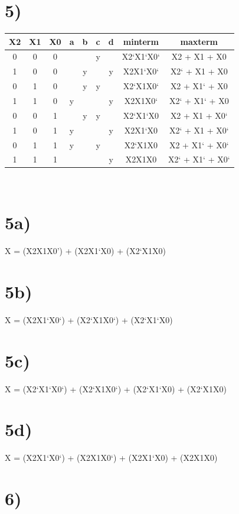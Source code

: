 \documentclass[a4paper,11pt]{article}
\begin{document}
\section*{5)}
\begin{tabular}{| c | c | c | c | c | c | c | c | c | }
  \hline	
       X2 & X1 & X0  & a & b & c & d & minterm & maxterm \\  \hline
       0 & 0 & 0  &  &  & y &   & X2`X1`X0` & X2 + X1 + X0 \\  \hline
       1 & 0 & 0  &  & y &  & y & X2X1`X0` & X2` + X1 + X0  \\  \hline
       0 & 1 & 0  &  & y & y &   & X2`X1X0` & X2 + X1` + X0 \\  \hline
       1 & 1 & 0  & y &  &  &  y & X2X1X0` & X2` + X1` + X0 \\  \hline
       0 & 0 & 1  &  & y & y &   & X2`X1`X0 & X2 + X1 + X0` \\  \hline
       1 & 0 & 1  & y &  &  &  y & X2X1`X0 & X2` + X1 + X0` \\  \hline
       0 & 1 & 1  & y &  & y &   & X2`X1X0 & X2 + X1` + X0` \\  \hline
       1 & 1 & 1  &  &  &  &  y & X2X1X0 & X2` + X1` + X0` \\  \hline
\end{tabular} \\

\section*{5a)}
X = (X2X1X0') + (X2X1`X0) + (X2`X1X0)

\section*{5b)}
X = (X2X1`X0`) + (X2`X1X0`) + (X2`X1`X0)

\section*{5c)}
X = (X2`X1`X0`) + (X2`X1X0`) + (X2`X1`X0) + (X2`X1X0)

\section*{5d)}
X = (X2X1`X0`) + (X2X1X0`) + (X2X1`X0) + (X2X1X0)


\section*{6)}
\end{document}
